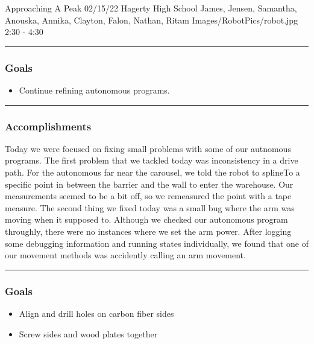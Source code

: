 \insertmeeting 
	{Approaching A Peak} 
	{02/15/22} 
	{Hagerty High School}
	{James, Jensen, Samantha, Anouska, Annika, Clayton, Falon, Nathan, Ritam}
	{Images/RobotPics/robot.jpg}
	{2:30 - 4:30}
	
\noindent\hfil\rule{\textwidth}{.4pt}\hfil
\subsubsection*{Goals}
\begin{itemize}
    \item Continue refining autonomous programs. 

\end{itemize} 

\noindent\hfil\rule{\textwidth}{.4pt}\hfil

\subsubsection*{Accomplishments}
Today we were focused on fixing small problems with some of our autnomous programs. The first problem that we tackled today was inconsistency in a drive path. For the autonomous far near the carousel, we told the robot to splineTo a specific point in between the barrier and the wall to enter the warehouse. Our measurements seemed to be a bit off, so we remeasured the point with a tape measure.
The second thing we fixed today was a small bug where the arm was moving when it supposed to. Although we checked our autonomous program throughly, there were no instances where we set the arm power. After logging some debugging information and running states individually, we found that one of our movement methods was accidently calling an arm movement. 

\noindent\hfil\rule{\textwidth}{.4pt}\hfil
\subsubsection*{Goals}
\begin{itemize}
    \item Align and drill holes on carbon fiber sides
	\item Screw sides and wood plates together


\end{itemize} 

